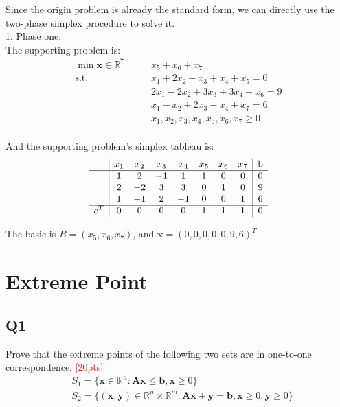 \documentclass[10pt]{article}
\renewcommand{\mathbf}{\boldsymbol}
\begin{document}
Since the origin problem is already the standard form, we can directly use the two-phase simplex procedure to solve it.\\
1. Phase one:\\
The supporting problem is:\\
\begin{equation}
	\begin{aligned}
		\min{\bm{x} \in \mathbb{R}^{7}}\qquad & x_5 + x_6 + x_7 \\
		\mathrm{s.t.}\qquad & x_{1} + 2x_{2} - x_{3} + x_{4} + x_5 = 0 \\
							& 2x_{1} - 2x_{2} + 3x_{3} + 3x_{4} + x_6 = 9 \\
							& x_{1} - x_{2} + 2x_{3} - x_{4} + x_7 = 6 \\
							& x_{1}, x_{2}, x_{3}, x_{4}, x_5, x_6, x_7 \geq 0 \\
	\end{aligned}
\end{equation}

And the supporting problem's simplex tableau is:\\
\begin{equation}
	\begin{aligned}
		\begin{array}{c|ccccccc|c}
			& x_1 & x_2 & x_3 & x_4 & x_5 & x_6 & x_7 & \text{b} \\
			\hline
			& 1 & 2 & -1 & 1 & 1 & 0 & 0 & 0 \\
			& 2 & -2 & 3 & 3 & 0 & 1 & 0 & 9 \\
			& 1 & -1 & 2 & -1 & 0 & 0 & 1 & 6 \\
			\hline
			c^T & 0 & 0 & 0 & 0 & 1 & 1 & 1 & 0 \\
		\end{array}
	\end{aligned}
\end{equation}

The basic is $B=(x_5,x_6,x_7)$, and $\mathbf{x}=(0,0,0,0,0,9,6)^T$.\\







\newpage

\section{Extreme Point}
\subsection{Q1}
Prove that the extreme points of the following two sets are in one-to-one correspondence.
\textcolor{red}{[20pts]}
\begin{equation}
	\begin{aligned}
		& S_{1} = \{ \bm{x} \in \mathbb{R}^{n} : \bm{Ax} \leq \bm{b}, \bm{x} \geq 0 \} \\
		& S_{2} = \{ \bm{(x, y)} \in \mathbb{R}^{n} \times \mathbb{R}^{m} : \bm{Ax} + \bm{y} = \bm{b}, \bm{x} \geq 0, \bm{y} \geq 0 \} \\
	\end{aligned}
\end{equation}
 
\end{document}
